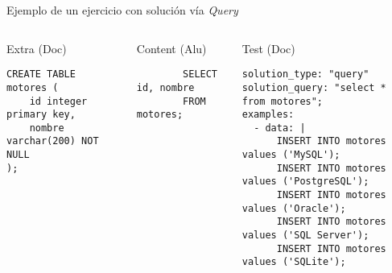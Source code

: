 Ejemplo de un ejercicio con solución vía \textit{Query}

\begin{columns}[t]
    \begin{listing}[H]
        \caption{Extra (Doc)}
        \begin{verbatim}
CREATE TABLE motores (
    id integer primary key,
    nombre varchar(200) NOT NULL
);
        \end{verbatim}
    \end{listing}

    \begin{listing}[H]
        \caption{Content (Alu)}
        \begin{verbatim}
        SELECT id, nombre
        FROM motores;
        \end{verbatim}
    \end{listing}

    \begin{listing}[H]
        \caption{Test (Doc)}
        \begin{verbatim}
solution_type: "query"
solution_query: "select * from motores";
examples:
  - data: |
      INSERT INTO motores values ('MySQL');
      INSERT INTO motores values ('PostgreSQL');
      INSERT INTO motores values ('Oracle');
      INSERT INTO motores values ('SQL Server');
      INSERT INTO motores values ('SQLite');
        \end{verbatim}
    \end{listing}

\end{columns}
